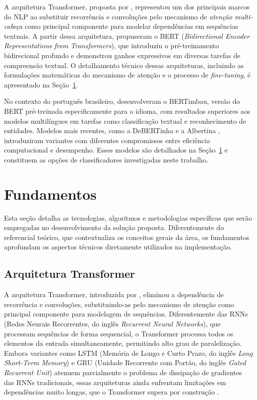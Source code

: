 \documentclass[
    12pt,                %
    openright,           %
    oneside,             %
    a4paper,             %
    english,             %
    brazil               %
]{abntex2}
\begin{document}
A arquitetura Transformer, proposta por , representou um dos principais marcos do NLP ao substituir recorrência e convoluções pelo mecanismo de \textit{atenção multi-cabeça} como principal componente para modelar dependências em sequências textuais. A partir dessa arquitetura,  propuseram o BERT (\textit{Bidirectional Encoder Representations from Transformers}), que introduziu o pré-treinamento bidirecional profundo e demonstrou ganhos expressivos em diversas tarefas de compreensão textual. O detalhamento técnico dessas arquiteturas, incluindo as formulações matemáticas do mecanismo de atenção e o processo de \textit{fine-tuning}, é apresentado na Seção~\ref{sec:fundamentos}.

No contexto do português brasileiro,  desenvolveram o BERTimbau, versão do BERT pré-treinada especificamente para o idioma, com resultados superiores aos modelos multilíngues em tarefas como classificação textual e reconhecimento de entidades. Modelos mais recentes, como a DeBERTinha \cite{Abonizio2023} e a Albertina \cite{Rodrigues2023}, introduziram variantes com diferentes compromissos entre eficiência computacional e desempenho. Esses modelos são detalhados na Seção~\ref{sec:fundamentos} e constituem as opções de classificadores investigadas neste trabalho.

\section{Fundamentos}
\label{sec:fundamentos}

Esta seção detalha as tecnologias, algoritmos e metodologias específicas que serão empregadas no desenvolvimento da solução proposta. Diferentemente do referencial teórico, que contextualiza os conceitos gerais da área, os fundamentos aprofundam os aspectos técnicos diretamente utilizados na implementação.


\subsection{Arquitetura Transformer}

A arquitetura Transformer, introduzida por , eliminou a dependência de recorrência e convoluções, substituindo-as pelo mecanismo de atenção como principal componente para modelagem de sequências. Diferentemente das RNNs (Redes Neurais Recorrentes, do inglês \textit{Recurrent Neural Networks}), que processam sequências de forma sequencial, o Transformer processa todos os elementos da entrada simultaneamente, permitindo alto grau de paralelização. Embora variantes como LSTM (Memória de Longo e Curto Prazo, do inglês \textit{Long Short-Term Memory}) e GRU (Unidade Recorrente com Portão, do inglês \textit{Gated Recurrent Unit}) atenuem parcialmente o problema de dissipação de gradientes das RNNs tradicionais, essas arquiteturas ainda enfrentam limitações em dependências muito longas, que o Transformer supera por construção \cite{Vaswani2017}.
\end{document}

